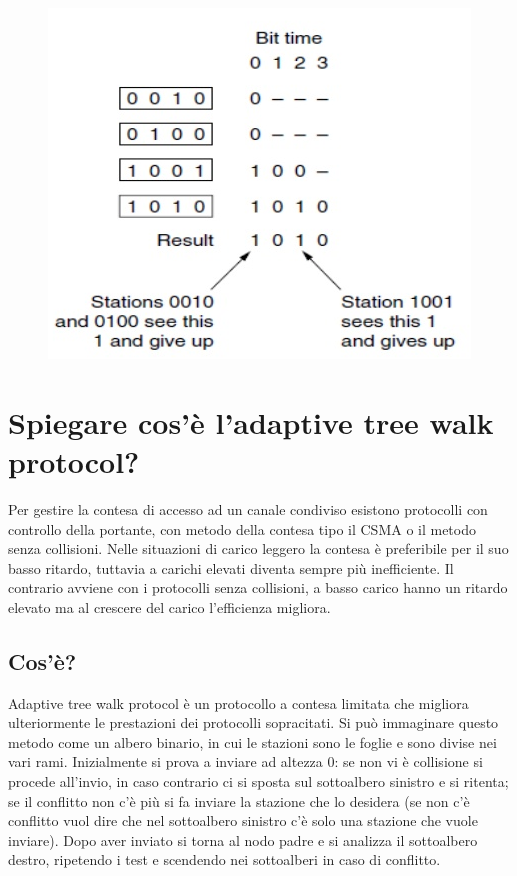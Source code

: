 \begin{figure}[H]
\centering
\includegraphics[scale=0.6]{res/img/25_FreeBinaryCountdown.png}
\end{figure} 

\section{Spiegare cos’è l’adaptive tree walk protocol?}

Per gestire la contesa di accesso ad un canale condiviso esistono protocolli con controllo della portante, con metodo della contesa tipo il CSMA o il metodo senza collisioni. Nelle situazioni di carico leggero la contesa è preferibile per il suo basso ritardo, tuttavia a carichi elevati diventa sempre più inefficiente. Il contrario avviene con i protocolli senza collisioni, a basso carico hanno un ritardo elevato ma al crescere del carico l’efficienza migliora.
\subsection{Cos'è?}
Adaptive tree walk protocol è un protocollo a contesa limitata che migliora ulteriormente le prestazioni dei protocolli sopracitati.
Si può immaginare questo metodo come un albero binario, in cui le stazioni sono le foglie e sono divise nei vari rami. Inizialmente si prova a inviare ad altezza 0: se non vi è collisione si procede all’invio, in caso contrario ci si sposta sul sottoalbero sinistro e si ritenta; se il conflitto non c’è più si fa inviare la stazione che lo desidera (se non c’è conflitto vuol dire che nel sottoalbero sinistro c’è solo una stazione che vuole inviare). Dopo aver inviato si torna al nodo padre e si analizza il sottoalbero destro, ripetendo i test e scendendo nei sottoalberi in caso di conflitto.

